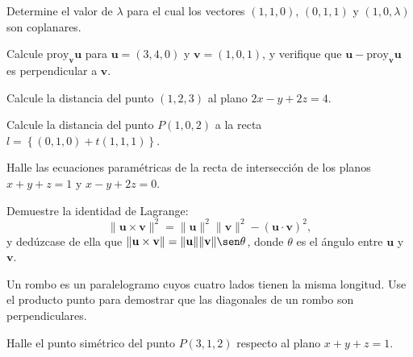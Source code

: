 \begin{prob}
Determine el valor de $\lambda$ para el cual los vectores $(1,1,0)$, $(0,1,1)$ y $(1,0,\lambda)$ son coplanares.
\end{prob}

\begin{prob}
Calcule $\text{proy}_{\mathbf{v}}\mathbf{u}$ para $\mathbf{u}=(3,4,0)$ y $\mathbf{v}=(1,0,1)$, y verifique que $\mathbf{u}-\text{proy}_{\mathbf{v}}\mathbf{u}$ es perpendicular a $\mathbf{v}$.
\end{prob}

\begin{prob}
Calcule la distancia del punto $(1,2,3)$ al plano $2x-y+2z=4$.
\end{prob}

\begin{prob}
Calcule la distancia del punto $P(1,0,2)$ a la recta $l=\left\lbrace (0,1,0)+t(1,1,1) \right\rbrace$.
\end{prob}

\begin{prob}
Halle las ecuaciones paramétricas de la recta de intersección de los planos $x+y+z=1$ y $x-y+2z=0$.
\end{prob}

\begin{prob}
Demuestre la identidad de Lagrange:
\[
\|\mathbf{u}\times\mathbf{v}\|^2=\|\mathbf{u}\|^2\|\mathbf{v}\|^2-(\mathbf{u}\cdot\mathbf{v})^2,
\]
y dedúzcase de ella que $\|\mathbf{u}\times\mathbf{v}\|=\|\mathbf{u}\|\|\mathbf{v}\|\sen\theta$, donde $\theta$ es el ángulo entre $\mathbf{u}$ y $\mathbf{v}$.
\end{prob}

\begin{prob}
Un rombo es un paralelogramo cuyos cuatro lados tienen la misma longitud. Use el producto punto para demostrar que las diagonales de un rombo son perpendiculares.
\end{prob}

\begin{prob}
Halle el punto simétrico del punto $P(3,1,2)$ respecto al plano $x+y+z=1$.
\end{prob}
